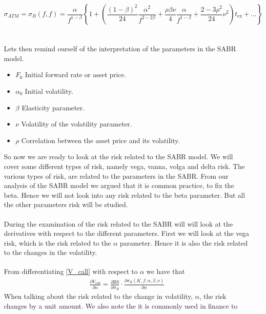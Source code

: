 \begin{equation}
    \sigma_{ATM} = \sigma_B(f, f) = \frac{\alpha}{f^{1-\beta}} \left\{ 1 + \left( \frac{(1-\beta)^2}{24} \frac{\alpha^2}{f^{2-2\beta}} + \frac{\rho \beta \nu}{4} \frac{\alpha}{f^{1-\beta}} + \frac{2-3\rho^2}{24} \nu^2 \right) t_{\text{ex}} + \ldots \right\}
    \label{sigma_ff_risk}
\end{equation}
\\\\
Lets then remind ourself of the interpretation of the parameters in the SABR model. 
\begin{itemize}
    \item $F_0$ \text{---} Initial forward rate or asset price.
    \item $\alpha_0$ \text{---} Initial volatility.
    \item $\beta$ \text{---} Elasticity parameter.
    \item $\nu$ \text{---} Volatility of the volatility parameter.
    \item $\rho$ \text{---} Correlation between the asset price and its volatility.
\end{itemize}
\noindent
So now we are ready to look at the risk related to the SABR model.
We will cover some different types of risk, namely vega, vanna, volga and delta risk. 
The various types of risk, are related to the parameters in the SABR. 
From our analysis of the SABR model we argued that it is common practice, 
to fix the beta. Hence we will not look into any risk related to the beta parameter. 
But all the other parameters risk will be studied. 
\\\\
During the examination of the risk related to the SABR will will look at 
the derivatives with respect to the different parameters. 
First we will look at the vega risk, which is the risk related to the $\alpha$ parameter. 
Hence it is also the risk related to the changes in the  volatility.
\\\\
From differentiating \autoref{V_call} with respect to $\alpha$ we have that
\begin{align}
    \frac{\partial V_{\text{call}}}{\partial \alpha} = 
    \frac{\partial \text{BS}}{\partial \sigma_B} \cdot \frac{\partial 
    \sigma_B(K, f; \alpha, \beta, \nu)}{\partial \alpha}
\end{align}
When talking about the risk related to the change in volatility, $\alpha$, 
the risk changes by a unit amount. We also note the it is commonly used in finance to 
